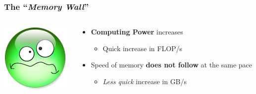 \documentclass[xcolor={x11names,svgnames}]{beamer}
\begin{document}
\begin{frame}
  \frametitle{The ``\emph{Memory Wall}''}

    \begin{columns}[c]
    \begin{column}{.1\textwidth}
      \includegraphics[width=\textwidth]{triste.png}
    \end{column}
    \begin{column}{.9\textwidth}
      
  \begin{itemize}
  \item\textbf{Computing Power} increases
    \begin{itemize}
    \item Quick increase in FLOP/s
    \end{itemize}

    \medskip
    
  \item Speed of memory \textbf{does not follow} at the same pace
        \begin{itemize}
    \item \emph{Less quick} increase in GB/s
    \end{itemize}
  \end{itemize}
\end{column}
\end{columns}


\end{frame}
\end{document}
